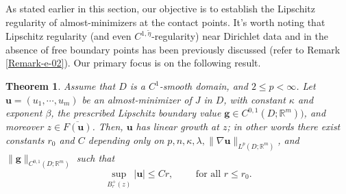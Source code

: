 \documentclass{amsart}
\newtheorem{theorem}{Theorem}[section]
\begin{document}
As stated earlier in this section, our objective is to establish the Lipschitz regularity of almost-minimizers at the contact points. It's worth noting that Lipschitz regularity (and even $C^{1,\tilde{\eta}}$-regularity) near Dirichlet data and in the absence of free boundary points  has been previously discussed (refer to Remark \ref{Remark-e-02}). Our primary focus is on the following result.

\begin{theorem}
\label{Bdr-result-contact}
Assume that $D$ is a %
$C^1$-smooth domain, and $2\le p<\infty$. Let $\mathbf{u}=(u_1, \cdots, u_m)$ be an almost-minimizer of $J$ in $D$, with constant $\kappa$ and exponent $\beta$, the prescribed Lipschitz boundary value $\mathbf{g}\in C^{0,1}(D;\mathbb{R}^m))$, and moreover $z \in \overline{F(\mathbf{u})}$. 
Then, $\mathbf{u}$ has linear growth at $z$; in other words there exist constants $r_0$ and $C$ depending only on $p,n,\kappa, \lambda ,\| \nabla \mathbf{u} \|_{L^p(D; \mathbb{R}^m)} $, and $\|\mathbf{g}\|_{C^{0,1}(D;\mathbb{R}^m)}$ such that
\[
\sup_{B_r^+(z)}|\mathbf{u} | \le Cr, \qquad \text{ for all } r\le r_0.
\]
\end{theorem}
\end{document}
